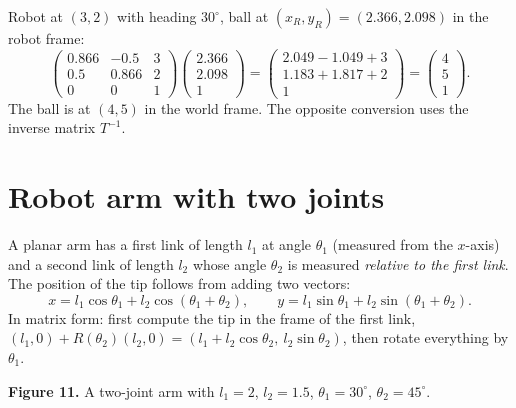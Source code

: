 \begin{example}
Robot at $(3,2)$ with heading $30^\circ$, ball at $(x_R,y_R)=(2.366,2.098)$ in the robot frame:
\[
\begin{pmatrix}0.866&-0.5&3\\0.5&0.866&2\\0&0&1\end{pmatrix}\begin{pmatrix}2.366\\2.098\\1\end{pmatrix}
=\begin{pmatrix}2.049-1.049+3\\1.183+1.817+2\\1\end{pmatrix}=\begin{pmatrix}4\\5\\1\end{pmatrix}.
\]
The ball is at $(4,5)$ in the world frame. The opposite conversion uses the inverse matrix $T^{-1}$.
\end{example}

\section*{Robot arm with two joints}
A planar arm has a first link of length $l_1$ at angle $\theta_1$ (measured from the $x$-axis) and a second link of length $l_2$ whose angle $\theta_2$ is measured \emph{relative to the first link}. The position of the tip follows from adding two vectors:
\[
x=l_1\cos\theta_1+l_2\cos(\theta_1+\theta_2),\qquad
y=l_1\sin\theta_1+l_2\sin(\theta_1+\theta_2).
\]
In matrix form: first compute the tip in the frame of the first link, $\left(l_1,0\right)+R(\theta_2)\left(l_2,0\right)=(l_1+l_2\cos\theta_2,\ l_2\sin\theta_2)$, then rotate everything by $\theta_1$.

\begin{center}

\small\textbf{Figure 11.} A two-joint arm with $l_1=2$, $l_2=1.5$, $\theta_1=30^\circ$, $\theta_2=45^\circ$.
\end{center}


